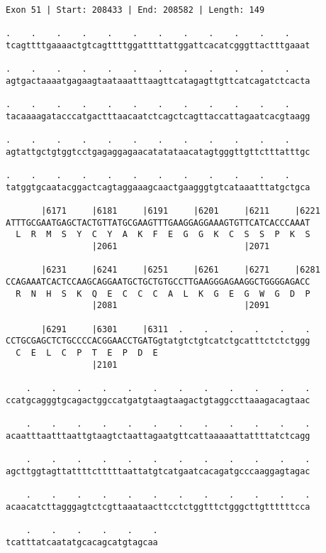 \documentclass{article}
\begin{document}
\begin{Verbatim}
Exon 51 | Start: 208433 | End: 208582 | Length: 149
 
.    .    .    .    .    .    .    .    .    .    .    .    
tcagttttgaaaactgtcagttttggattttattggattcacatcgggttactttgaaat
  
.    .    .    .    .    .    .    .    .    .    .    .    
agtgactaaaatgagaagtaataaatttaagttcatagagttgttcatcagatctcacta
  
.    .    .    .    .    .    .    .    .    .    .    .    
tacaaaagatacccatgactttaacaatctcagctcagttaccattagaatcacgtaagg
  
.    .    .    .    .    .    .    .    .    .    .    .    
agtattgctgtggtcctgagaggagaacatatataacatagtgggttgttctttatttgc
  
.    .    .    .    .    .    .    .    .    .    .    .    
tatggtgcaatacggactcagtaggaaagcaactgaagggtgtcataaatttatgctgca
  
       |6171     |6181     |6191     |6201     |6211     |6221
ATTTGCGAATGAGCTACTGTTATGCGAAGTTTGAAGGAGGAAAGTGTTCATCACCCAAAT
  L  R  M  S  Y  C  Y  A  K  F  E  G  G  K  C  S  S  P  K  S
                 |2061                         |2071        
  
       |6231     |6241     |6251     |6261     |6271     |6281
CCAGAAATCACTCCAAGCAGGAATGCTGCTGTGCCTTGAAGGGAGAAGGCTGGGGAGACC
  R  N  H  S  K  Q  E  C  C  C  A  L  K  G  E  G  W  G  D  P
                 |2081                         |2091        
  
       |6291     |6301     |6311  .    .    .    .    .    .
CCTGCGAGCTCTGCCCCACGGAACCTGATGgtatgtctgtcatctgcatttctctctggg
  C  E  L  C  P  T  E  P  D  E                              
                 |2101                                      
  
    .    .    .    .    .    .    .    .    .    .    .    .
ccatgcagggtgcagactggccatgatgtaagtaagactgtaggccttaaagacagtaac
  
    .    .    .    .    .    .    .    .    .    .    .    .
acaatttaatttaattgtaagtctaattagaatgttcattaaaaattattttatctcagg
  
    .    .    .    .    .    .    .    .    .    .    .    .
agcttggtagttattttctttttaattatgtcatgaatcacagatgcccaaggagtagac
  
    .    .    .    .    .    .    .    .    .    .    .    .
acaacatcttagggagtctcgttaaataacttcctctggtttctgggcttgttttttcca
  
    .    .    .    .    .    .
tcatttatcaatatgcacagcatgtagcaa
\end{Verbatim}
\end{document}
